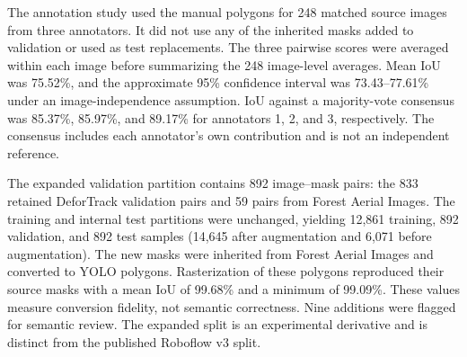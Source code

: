 
The annotation study used the manual polygons for 248 matched source images
from three annotators. It did not use any of the inherited masks added to
validation or used as test replacements. The three pairwise scores were
averaged within each image before summarizing the 248 image-level averages.
Mean IoU was 75.52\%, and the approximate 95\% confidence interval was
73.43--77.61\% under an image-independence assumption. IoU against a
majority-vote consensus was 85.37\%, 85.97\%, and 89.17\% for annotators 1, 2,
and 3, respectively. The consensus includes each annotator's own contribution
and is not an independent reference.

\begin{table}[t]
\centering
\caption{Agreement among three annotators on 248 matched source images. Entries are means and sample standard deviations.}
\label{tab:interannotator}
\end{table}

The expanded validation partition contains 892 image--mask pairs: the 833 retained
DeforTrack validation pairs and 59 pairs from Forest Aerial Images. The training
and internal test partitions were unchanged, yielding 12,861 training, 892
validation, and 892 test samples (14,645 after augmentation and 6,071 before
augmentation). The new masks were inherited from Forest Aerial Images and
converted to YOLO polygons. Rasterization of these polygons reproduced their
source masks with a mean IoU of 99.68\% and a minimum of 99.09\%. These values
measure conversion fidelity, not semantic correctness. Nine additions were
flagged for semantic review. The expanded split is an experimental derivative
and is distinct from the published Roboflow v3 split.

